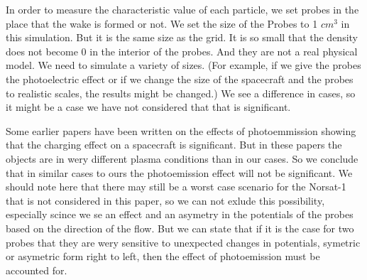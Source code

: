 
In order to measure the characteristic value of each particle, we set probes in the
place that the wake is formed or not. 
We set the size of the Probes to 1 $cm^3$ in this simulation. But it is the same size as the grid.
It is so small that the density does not become 0 in the interior of the probes. And they are not a real 
physical model. We need to simulate a variety of sizes.
(For example, if we give the probes the photoelectric effect or if we change the size of the spacecraft and 
the probes to realistic scales, the results might be changed.)
We see a difference in cases, so it might be a case we have not considered that that is significant.

Some earlier papers have been written on the effects of photoemmission showing that the charging effect 
on a spacecraft is significant.\citep{ergun_spacecraft_2010} But in these papers the objects are in wery different
plasma conditions than in our cases. So we conclude that in similar cases to ours the photoemission effect
will not be significant. We should note here that there may still be a worst case scenario for the Norsat-1
that is not considered in this paper, so we can not exlude this possibility, especially scince we se an effect and an
asymetry in the potentials of the probes based on the direction of the flow. But we can state that if 
it is the case for two probes that they are wery sensitive to unexpected changes in potentials, symetric or asymetric form 
right to left, then the effect of photoemission must be accounted for.